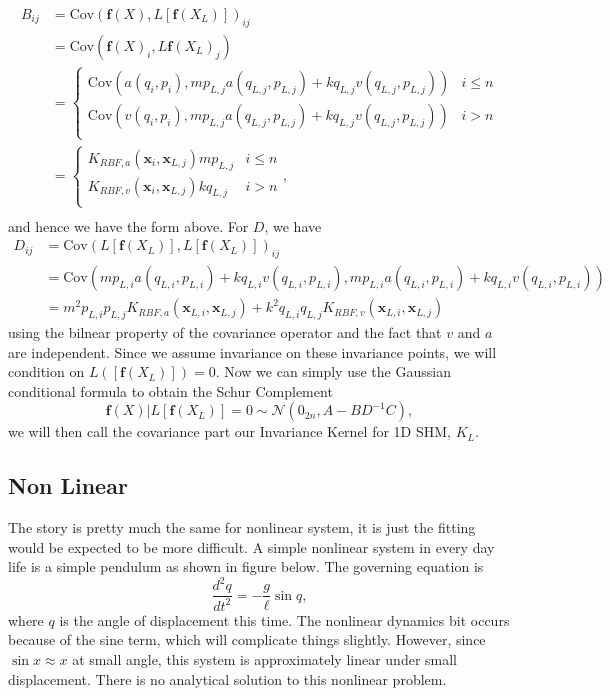 \documentclass{statsmsc}
\begin{document}
\begin{align*}
B_{ij} &= \mathrm{Cov}(\mathbf{f}(X), L[\mathbf{f}(X_L)])_{ij} \\
       &= \mathrm{Cov}(\mathbf{f}(X)_i, L\mathbf{f}(X_L)_j) \\ 
       &= \begin{cases}
        \mathrm{Cov}(a(q_i, p_i), mp_{L,j}a(q_{L,j},p_{L,j}) + kq_{L,j}v(q_{L,j},p_{L,j})) & i\le n \\ 
        \mathrm{Cov}(v(q_i, p_i), mp_{L,j}a(q_{L,j},p_{L,j}) + kq_{L,j}v(q_{L,j},p_{L,j})) & i>n \\ 
       \end{cases} \\
       &= \begin{cases}
        K_{RBF,a}(\mathbf{x}_i, \mathbf{x}_{L,j}) mp_{L,j} & i\le n \\ 
        K_{RBF,v}(\mathbf{x}_i, \mathbf{x}_{L,j}) kq_{L,j} & i>n \\ 
       \end{cases}, \\
\end{align*}
and hence we have the form above. 
For $D$, we have
\begin{align*}
D_{ij} &= \mathrm{Cov}(L[\mathbf{f}(X_L)], L[\mathbf{f}(X_L)])_{ij} \\
       &= \mathrm{Cov}(mp_{L,i}a(q_{L,i},p_{L,i}) + kq_{L,i}v(q_{L,i},p_{L,i}), mp_{L,i}a(q_{L,i},p_{L,i}) + kq_{L,i}v(q_{L,i},p_{L,i})) \\
       &= m^2p_{L,i}p_{L,j}K_{RBF,a}(\mathbf{x}_{L,i},\mathbf{x}_{L,j}) + k^2q_{L,i}q_{L,j}K_{RBF,v}(\mathbf{x}_{L,i},\mathbf{x}_{L,j})
\end{align*}
using the bilnear property of the covariance operator and the fact that $v$ and $a$ are independent.
Since we assume invariance on these invariance points, we will condition on $L([\mathbf{f}(X_L)])=0.$
Now we can simply use the Gaussian conditional formula to obtain the Schur Complement
$$
\mathbf{f}(X)|L[\mathbf{f}(X_L)]=0\sim\mathcal{N}(0_{2n},A-BD^{-1}C),
$$
we will then call the covariance part our Invariance Kernel for 1D SHM, $K_L$.

\subsection{Non Linear}
The story is pretty much the same for nonlinear system, it is just the fitting would be expected to be more difficult.
A simple nonlinear system in every day life is a simple pendulum as shown in figure below.
The governing equation is 
$$
\frac{d^2q}{dt^2}=-\frac{g}{\ell}\sin q, 
$$
where $q$ is the angle of displacement this time. 
The nonlinear dynamics bit occurs because of the sine term, which will complicate things slightly. 
However, since $\sin x \approx x$ at small angle, this system is approximately linear under small displacement. 
There is no analytical solution to this nonlinear problem.
\end{document}
